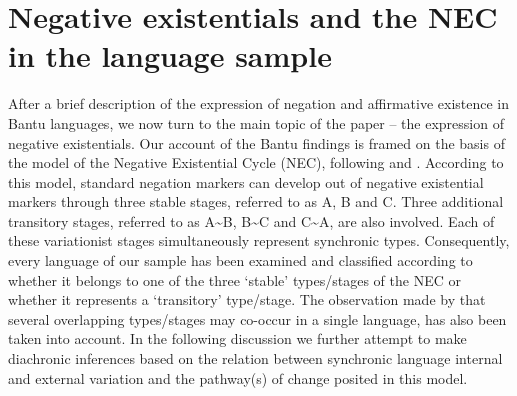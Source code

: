 \documentclass[output=paper]{langscibook}
\begin{document}
\section{Negative existentials and the NEC in the language sample}\label{sec:1:4}
After a brief description of the expression of negation and affirmative
existence in Bantu languages, we now turn to the main topic of the paper –
the expression of negative existentials. Our account of the Bantu findings
is framed on the basis of the model of the Negative Existential Cycle
(NEC), following \citet{Croft1991} and
\textcites{Veselinova2013}{Veselinova2014}{Veselinova2016}. According to this
model, standard negation markers can develop out of negative existential
markers through three stable stages, referred to as A, B and C. Three
additional transitory stages, referred to as A{\textasciitilde}B,
B{\textasciitilde}C and C{\textasciitilde}A, are also involved. Each of
these variationist stages simultaneously represent synchronic types.
Consequently, every language of our sample has been examined and classified
according to whether it belongs to one of the three `stable' types/stages
of the NEC or whether it represents a `transitory' type/stage. The
observation made by \textcites{Veselinova2014,Veselinova2016} that several
overlapping types/stages may co-occur in a single language, has also been
taken into account. In the following discussion we further attempt to make
diachronic inferences based on the relation between synchronic language
internal and external variation and the pathway(s) of change posited in this model.
\end{document}
